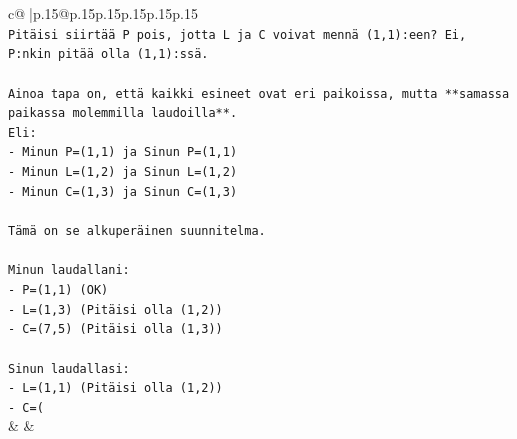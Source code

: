 \documentclass{article}
\begin{document}
{\begin{supertabular}{c@{$\;$}|p{.15\linewidth}@{}p{.15\linewidth}p{.15\linewidth}p{.15\linewidth}p{.15\linewidth}p{.15\linewidth}}
{{{\\ 
\texttt{Pitäisi siirtää P pois, jotta L ja C voivat mennä (1,1):een? Ei, P:nkin pitää olla (1,1):ssä.} \\
\\ 
\texttt{Ainoa tapa on, että kaikki esineet ovat eri paikoissa, mutta **samassa paikassa molemmilla laudoilla**.} \\
\texttt{Eli:} \\
\texttt{{-} Minun P=(1,1) ja Sinun P=(1,1)} \\
\texttt{{-} Minun L=(1,2) ja Sinun L=(1,2)} \\
\texttt{{-} Minun C=(1,3) ja Sinun C=(1,3)} \\
\\ 
\texttt{Tämä on se alkuperäinen suunnitelma.} \\
\\ 
\texttt{Minun laudallani:} \\
\texttt{{-} P=(1,1) (OK)} \\
\texttt{{-} L=(1,3) (Pitäisi olla (1,2))} \\
\texttt{{-} C=(7,5) (Pitäisi olla (1,3))} \\
\\ 
\texttt{Sinun laudallasi:} \\
\texttt{{-} L=(1,1) (Pitäisi olla (1,2))} \\
\texttt{{-} C=(} \\
            }
        }
    }
    & & \\ \\


\end{supertabular}}
\end{document}
